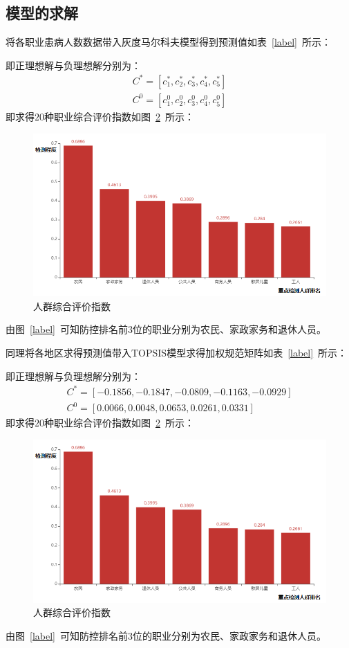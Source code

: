 \documentclass{whutmod}
\begin{document}
    \subsection{模型的求解}
    将各职业患病人数数据带入灰度马尔科夫模型得到预测值如表~\ref{label}~所示：

    即正理想解与负理想解分别为：
    \begin{gather}
    C^{*}=[c_{1}^{*},c_{2}^{*},c_{3}^{*},c_{4}^{*},c_{5}^{*}]\\
    C^{0}=[c_{1}^{0},c_{2}^{0},c_{3}^{0},c_{4}^{0},c_{5}^{0}]
    \end{gather}
    即求得$20$种职业综合评价指数如图~\ref{oc}~所示：
    \begin{figure}[H]
    	\centering
    	\includegraphics[width=\textwidth]{figures/oc.png}
    	\caption{人群综合评价指数}\label{oc}
    \end{figure}
	

    由图~\ref{label}~可知防控排名前$3$位的职业分别为农民、家政家务和退休人员。
    
    同理将各地区求得预测值带入TOPSIS模型求得加权规范矩阵如表~\ref{label}~所示：
    
    
      即正理想解与负理想解分别为：
    \begin{gather}
    C^{*}=[-0.1856,-0.1847,-0.0809,-0.1163,-0.0929]\\
    C^{0}=[0.0066,0.0048,0.0653,0.0261,0.0331]
    \end{gather}
    即求得$20$种职业综合评价指数如图~\ref{oc}~所示：
    \begin{figure}[H]
    	\centering
    	\includegraphics[width=.9\textwidth]{figures/oc.png}
    	\caption{人群综合评价指数}\label{oc}
    \end{figure}
    由图~\ref{label}~可知防控排名前$3$位的职业分别为农民、家政家务和退休人员。
    
\end{document}
